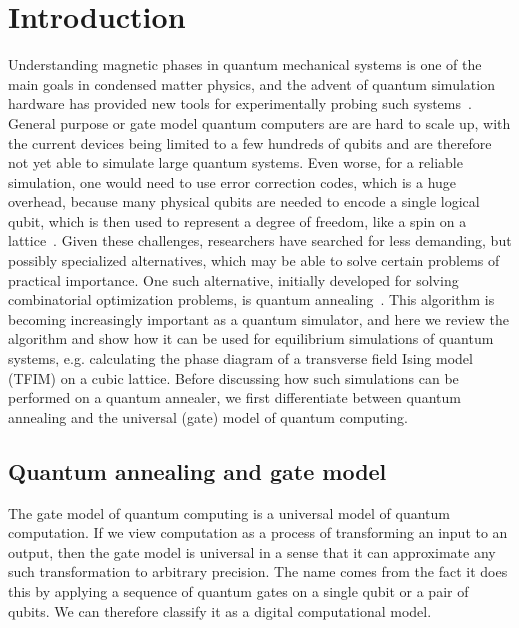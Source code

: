 \documentclass[12pt,a4paper]{article}
\begin{document}
\tableofcontents

\section{Introduction} \label{sec:intro}
\hspace*{0.3cm}
Understanding magnetic phases in quantum mechanical systems is one of the main goals in condensed matter physics,
and the advent of quantum simulation hardware has provided new tools for experimentally probing such systems~\cite*{harris2018phase}.
General purpose or gate model quantum computers are are hard to scale up, with the
current devices being limited to a few hundreds of qubits and are therefore not yet able to simulate
large quantum systems. Even worse, for a reliable simulation,
one would need to use error correction codes, which is a huge overhead, because many physical qubits are
needed to encode a single logical qubit, which is then used to represent a degree of freedom, like a spin on a lattice~\cite*{preskill2018quantum}.
Given these challenges, researchers have searched for less demanding, but possibly specialized alternatives,
which may be able to solve certain problems of practical importance.
One such alternative, initially developed for solving combinatorial optimization problems, is quantum annealing~\cite*{hauke2020perspectives}. This algorithm is becoming increasingly important as a quantum simulator, and here we review the algorithm and show how it can be used for equilibrium simulations of quantum systems,
e.g. calculating the phase diagram of a transverse field Ising model (TFIM) on a cubic lattice. 
Before discussing how such simulations can be performed on a quantum annealer,
we first differentiate between quantum annealing and the universal (gate) model of quantum computing.


\subsection*{Quantum annealing and gate model} \label{sec:qa_vs_gate}

\hspace*{0.3cm}
The gate model of quantum computing is a universal model of quantum computation. If we view computation
as a process of transforming an input to an output, then the gate model is universal in a sense that it can
approximate any such transformation to arbitrary precision. The name comes from the fact
it does this by applying a sequence of quantum gates on a single qubit or a pair of qubits.
We can therefore classify it as a digital computational model.
\end{document}
